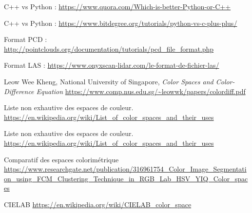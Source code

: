\documentclass[12pt,titlepage,french]{article}
\newcounter{firstbib}
\begin{document}
\renewcommand{\refname}{Comparaison C++/Python}
\begin{thebibliography}{3}
\setcounter{enumiv}{\value{firstbib}}

 C++ vs Python :
\url{https://www.quora.com/Which-is-better-Python-or-C++}

 C++ vs Python :
\url{https://www.bitdegree.org/tutorials/python-vs-c-plus-plus/}

\setcounter{firstbib}{\value{enumiv}}
\end{thebibliography}


\renewcommand{\refname}{Formats de fichier}
\begin{thebibliography}{3}
\setcounter{enumiv}{\value{firstbib}}

 Format PCD :
\url{http://pointclouds.org/documentation/tutorials/pcd_file_format.php}

 Format LAS :
\url{https://www.onyxscan-lidar.com/le-format-de-fichier-las/ }

\setcounter{firstbib}{\value{enumiv}}
\end{thebibliography}

\renewcommand{\refname}{Espaces colorimétriques}
\begin{thebibliography}{3}
\setcounter{enumiv}{\value{firstbib}}

 Leow Wee Kheng, National University of Singapore, \textit{Color Spaces and Color-Difference Equation}
\url{https://www.comp.nus.edu.sg/~leowwk/papers/colordiff.pdf}

 Liste non exhautive des espaces de couleur.
\url{https://en.wikipedia.org/wiki/List_of_color_spaces_and_their_uses}

 Liste non exhautive des espaces de couleur.
\url{https://en.wikipedia.org/wiki/List_of_color_spaces_and_their_uses}

 Comparatif des espaces colorimétrique
\url{https://www.researchgate.net/publication/316961754_Color_Image_Segmentation_using_FCM_Clustering_Technique_in_RGB_Lab_HSV_YIQ_Color_spaces}

CIELAB
\url{https://en.wikipedia.org/wiki/CIELAB_color_space}

\setcounter{firstbib}{\value{enumiv}}
\end{thebibliography}
\end{document}
